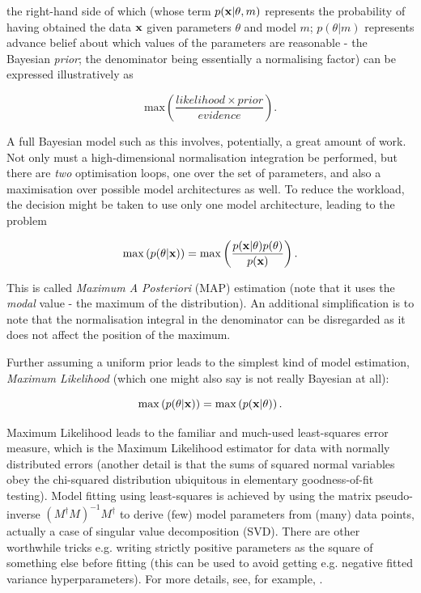the right-hand side of which (whose term $p(\mathbf{x}|\theta,m)$ represents the probability of having 
obtained the data $\mathbf{x}$ given parameters $\theta$ and model $m$; $p(\theta|m)$ represents advance 
belief about which values of the parameters are reasonable - the Bayesian {\it prior}; the 
denominator being essentially a normalising factor) can be expressed illustratively as

\begin{equation}
\mathrm{max} \left ( \frac{likelihood \times prior }{evidence} \right ).
\end{equation}

A full Bayesian model such as this involves, potentially, a great amount of work.  
Not only must a high-dimensional normalisation integration be performed, but there are {\it two} 
optimisation loops, one over the set of parameters, and also a maximisation over possible model 
architectures as well.  To reduce the workload, the decision might be taken to use only one model architecture, 
leading to the problem

\begin{equation}
\mathrm{max} \left ( p(\theta|\mathbf{x}) \right ) = \mathrm{max} \left ( \frac{p(\mathbf{x}|\theta)p(\theta) 
}{p(\mathbf{x})} \right ).
\end{equation}

This is called {\it Maximum A Posteriori} (MAP) estimation (note that it uses the {\it modal} value 
- the maximum of the distribution).  
An additional simplification is to note that the normalisation integral in the denominator can be 
disregarded as it does not affect the position of the maximum.

Further assuming a uniform prior leads to the simplest kind of model estimation, {\it Maximum 
Likelihood} (which one might also say is not really Bayesian at all):

\begin{equation}
\mathrm{max} \left ( p(\theta|\mathbf{x}) \right ) = \mathrm{max} \left ( p(\mathbf{x}| \theta) \right ).
\end{equation}

Maximum Likelihood leads to the familiar and much-used least-squares error measure, which is the 
Maximum Likelihood estimator for data with normally distributed errors (another detail is that the 
sums of squared normal variables obey the chi-squared distribution ubiquitous in elementary 
goodness-of-fit testing).  
Model fitting using least-squares is achieved by using the matrix pseudo-inverse $\left ( 
M^{\dagger} M \right)^{-1} M^{\dagger}$ to derive (few) model parameters from (many) data points, 
actually a case of singular value decomposition (SVD).  
There are other worthwhile tricks e.g. writing strictly positive parameters as the square of 
something else before fitting (this can be used to avoid getting e.g. negative fitted variance 
hyperparameters).  For more details, see, for example, \cite{gershenfeld}.

